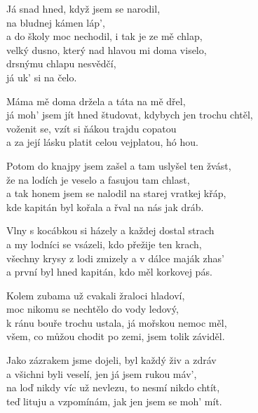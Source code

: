 \vspace{-2pt}

\ve{}
Já snad hned, když jsem se narodil,\\
na bludnej kámen láp’,\\
a do školy moc nechodil, i tak je ze mě chlap,\\
velký dusno, který nad hlavou mi doma viselo,\\
drsnýmu chlapu nesvědčí,\\
já uk’ si na čelo.
\vspace{-2pt}

\cho{}
Máma mě doma držela a táta na mě dřel,\\
já moh’ jsem jít hned študovat, kdybych jen trochu chtěl,\\
voženit se, vzít si ňákou trajdu copatou\\
a za její lásku platit celou vejplatou, hó hou.
\vspace{-3pt}

\ve{}
Potom do knajpy jsem zašel a tam uslyšel ten žvást,\\
že na lodích je veselo a fasujou tam chlast,\\
a tak honem jsem se nalodil na starej vratkej křáp,\\
kde kapitán byl kořala a řval na nás jak dráb.
\vspace{-3pt}

\cho{}
\vspace{-3pt}

\ve{}
Vlny s kocábkou si házely a každej dostal strach\\
a my lodníci se vsázeli, kdo přežije ten krach,\\
všechny krysy z lodi zmizely a v dálce maják zhas’\\
a první byl hned kapitán, kdo měl korkovej pás.
\vspace{-3pt}

\cho{}
\vspace{-3pt}
\ve{}

Kolem zubama už cvakali žraloci hladoví,\\
moc nikomu se nechtělo do vody ledový,\\
k ránu bouře trochu ustala, já mořskou nemoc měl,\\
všem, co můžou chodit po zemi, jsem tolik záviděl.
\vspace{-2pt}

\cho{}
\vspace{-3pt}

\ve{}
Jako zázrakem jsme dojeli, byl každý živ a zdráv\\
a všichni byli veselí, jen já jsem rukou máv’,\\
na loď nikdy víc už nevlezu, to nesmí nikdo chtít,\\
teď lituju a vzpomínám, jak jen jsem se moh’ mít.
\vspace{-3pt}

\cho{}
\vspace{-2pt}

\esong